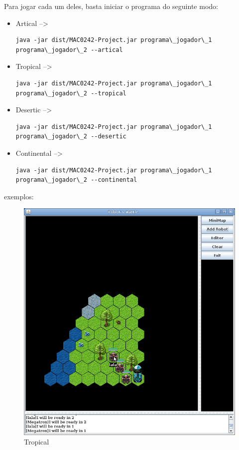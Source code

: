 \documentclass[a4paper]{article}
\begin{document}
{{{{Para jogar cada um deles, basta iniciar o programa do seguinte modo:

\begin{itemize}

	\item Artical --> \begin{verbatim}java -jar dist/MAC0242-Project.jar programa\_jogador\_1 programa\_jogador\_2 --artical\end{verbatim}

	\item Tropical --> \begin{verbatim}java -jar dist/MAC0242-Project.jar programa\_jogador\_1 programa\_jogador\_2 --tropical\end{verbatim}

	\item Desertic --> \begin{verbatim}java -jar dist/MAC0242-Project.jar programa\_jogador\_1 programa\_jogador\_2 --desertic\end{verbatim}

	\item Continental --> \begin{verbatim}java -jar dist/MAC0242-Project.jar programa\_jogador\_1 programa\_jogador\_2 --continental\end{verbatim}



\end{itemize}

\bigskip
\bigskip


{\textcolor{NavyBlue}{\LARGE exemplos:}

\bigskip

\begin{figure}[h]
	\centering
    \includegraphics[scale=0.3]{TROPICAL.png}
    \caption{Tropical}
\end{figure}

}}}}}
\end{document}
